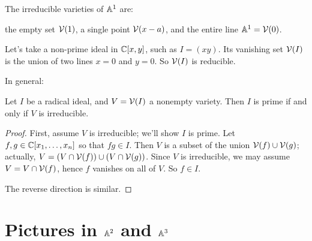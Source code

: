 \begin{example}
	The irreducible varieties of $\mathbb A^1$ are:
	\begin{itemize}
		\ii the empty set $\mathcal V(1)$,
		\ii a single point $\mathcal V(x-a)$, and
		\ii the entire line $\mathbb A^1 = \mathcal V(0)$.
	\end{itemize}
\end{example}
\begin{example}
	Let's take a non-prime ideal in $\mathbb C[x,y]$, such as $I = (xy)$.
	Its vanishing set $\mathcal V(I)$ is the union of two lines $x=0$ and $y=0$.
	So $\mathcal V(I)$ is reducible.
\end{example}


In general:
\begin{theorem}
	Let $I$ be a radical ideal, and $V = \mathcal V(I)$ a nonempty variety.
	Then $I$ is prime if and only if $V$ is irreducible.
\end{theorem}
\begin{proof}
	First, assume $V$ is irreducible; we'll show $I$ is prime.
	Let $f,g \in \mathbb C[x_1, \dots, x_n]$ so that $fg \in I$.
	Then $V$ is a subset of the union $\mathcal V(f) \cup \mathcal V(g)$;
	actually, $V = \left( V \cap \mathcal V(f) \right) \cup \left( V \cap \mathcal V(g) \right)$.
	Since $V$ is irreducible, we may assume $V = V \cap \mathcal V(f)$,
	hence $f$ vanishes on all of $V$. So $f \in I$.

	The reverse direction is similar.
\end{proof}


\section{Pictures in $\mathbb A^2$ and $\mathbb A^3$}

